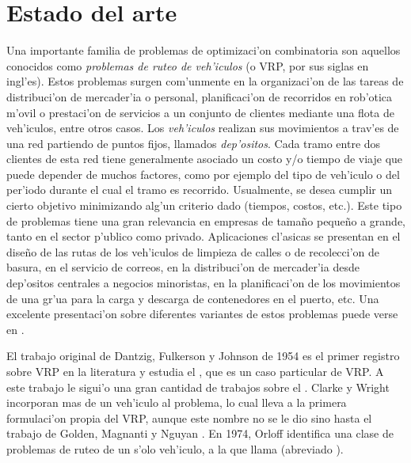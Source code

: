 
\section{Estado del arte}

Una importante familia de problemas de optimizaci'on combinatoria son aquellos conocidos como \textit{problemas de ruteo de veh'iculos} (o VRP, por sus siglas en ingl'es). Estos problemas surgen com'unmente en la organizaci'on de las tareas de distribuci'on de mercader'ia o personal, planificaci'on de recorridos en rob'otica m'ovil o prestaci'on de servicios a un conjunto de clientes mediante una flota de veh'iculos, entre otros casos. Los \textit{veh'iculos} realizan sus movimientos a trav'es de una red partiendo de puntos fijos, llamados \textit{dep'ositos}. Cada tramo entre dos clientes de esta red tiene generalmente asociado un costo y/o tiempo de viaje que puede depender de muchos factores, como por ejemplo del tipo de veh'iculo o del per'iodo durante el cual el tramo es recorrido. Usualmente, se desea cumplir un cierto objetivo minimizando alg'un criterio dado (tiempos, costos, etc.). Este tipo de problemas tiene una gran relevancia en empresas de tama\~no peque\~no a grande, tanto en el sector p'ublico como privado. Aplicaciones cl'asicas se presentan en el dise\~no de las rutas de los veh'iculos de limpieza de calles o de recolecci'on de basura, en el servicio de correos, en la distribuci'on de mercader'ia desde dep'ositos centrales a negocios minoristas, en la planificaci'on de los movimientos de una gr'ua para la carga y descarga de contenedores en el puerto, etc. Una excelente presentaci'on sobre diferentes variantes de estos problemas puede verse en \cite{To01}.

El trabajo original de Dantzig, Fulkerson y Johnson de 1954 \cite{Da54} es el primer registro sobre VRP en la literatura y estudia el , que es un caso particular de VRP. A este trabajo le sigui'o una gran cantidad de trabajos sobre el . Clarke y Wright \cite{Cl64} incorporan mas de un veh'iculo al problema, lo cual lleva a la primera formulaci'on propia del VRP, aunque este nombre no se le dio sino hasta el trabajo de Golden, Magnanti y Nguyan \cite{Go77}. En 1974, Orloff \cite{Or74} identifica una clase de problemas de ruteo de un s'olo veh'iculo, a la que llama  (abreviado ).

